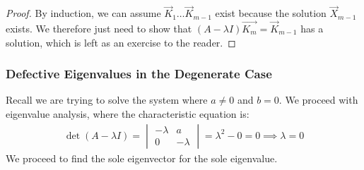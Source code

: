 \documentclass[11pt, oneside]{article}
\theoremstyle{plain}
\theoremstyle{definition}
\begin{document}
\begin{proof}
  By induction, we can assume \( \vec{K}_1 \dots \vec{K}_{m - 1} \) exist
  because the solution \( \vec{X}_{m - 1} \) exists.
  We therefore just need to show that
  \( (A - \lambda I)\vec{K_m} = \vec{K}_{m - 1} \) has a solution,
  which is left as an exercise to the reader.
\end{proof}

\subsubsection{Defective Eigenvalues in the Degenerate Case}
Recall we are trying to solve the system where \( a \neq 0 \) and \( b = 0 \).
We proceed with eigenvalue analysis, where the characteristic equation is: 
\begin{align*}
  \det(A - \lambda I) =
  \begin{vmatrix} -\lambda & a \\ 0 & -\lambda \end{vmatrix}
  = \lambda^2 - 0 = 0 \implies \lambda = 0
\end{align*}
We proceed to find the sole eigenvector for the sole eigenvalue.
\end{document}
